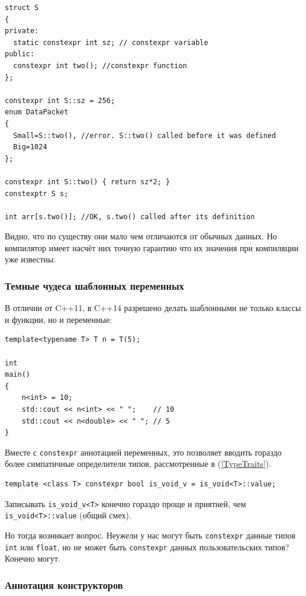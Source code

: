 \documentclass[a4paper,12pt,oneside]{article}
\begin{document}
\begin{lstlisting}
struct S
{
private:
  static constexpr int sz; // constexpr variable
public:
  constexpr int two(); //constexpr function
};

constexpr int S::sz = 256;
enum DataPacket
{
  Small=S::two(), //error. S::two() called before it was defined
  Big=1024
};

constexpr int S::two() { return sz*2; }
constexptr S s;

int arr[s.two()]; //OK, s.two() called after its definition
\end{lstlisting}

Видно, что по существу они мало чем отличаются от обычных данных. Но компилятор имеет насчёт них точную гарантию что их значения при компиляции уже известны.

\subsubsection{Темные чудеса шаблонных переменных}

В отличии от C++11, в C++14 разрешено делать шаблонными не только классы и функции, но и переменные:

\begin{lstlisting}
template<typename T> T n = T(5);

int 
main()
{
    n<int> = 10;
    std::cout << n<int> << " ";    // 10
    std::cout << n<double> << " "; // 5
}
\end{lstlisting}

Вместе с \lstinline!constexpr! аннотацией переменных, это позволяет вводить гораздо более симпатичные определители типов, рассмотренные в (\ref{TypeTraits}).

\begin{lstlisting}
template <class T> constexpr bool is_void_v = is_void<T>::value;
\end{lstlisting}

Записывать \lstinline!is_void_v<T>! конечно гораздо проще и приятней, чем \lstinline!is_void<T>::value! (общий смех).

Но тогда возникает вопрос. Неужели у нас могут быть \lstinline!constexpr! данные типов \lstinline!int! или \lstinline!float!, но не может быть \lstinline!constexpr! данных пользовательских типов? Конечно могут.

\subsubsection{Аннотация конструкторов}
\end{document}
